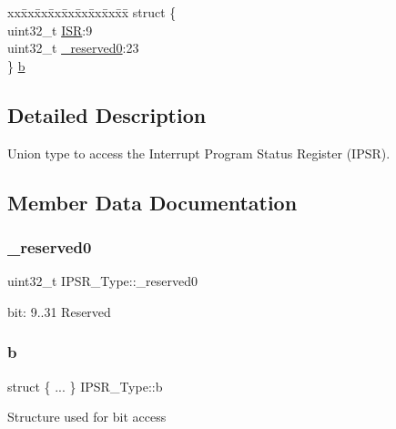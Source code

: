 \begin{DoxyCompactItemize}
\begin{tabbing}
\end{tabbing}\item 
\begin{tabbing}
xx\=xx\=xx\=xx\=xx\=xx\=xx\=xx\=xx\=\kill
struct \{\\
\>uint32\_t \mbox{\hyperlink{union_i_p_s_r___type_ab46e5f1b2f4d17cfb9aca4fffcbb2fa5}{ISR}}:9\\
\>uint32\_t \mbox{\hyperlink{union_i_p_s_r___type_ad2eb0a06de4f03f58874a727716aa9aa}{\_reserved0}}:23\\
\} \mbox{\hyperlink{union_i_p_s_r___type_a4f5b60c40c6b98068f74da39a8d501ca}{b}}\\

\end{tabbing}\end{DoxyCompactItemize}


\subsection{Detailed Description}
Union type to access the Interrupt Program Status Register (I\+P\+SR). 

\subsection{Member Data Documentation}
\mbox{\label{union_i_p_s_r___type_ad2eb0a06de4f03f58874a727716aa9aa}} 
\subsubsection{\texorpdfstring{\_reserved0}{\_reserved0}}
{\footnotesize\ttfamily uint32\+\_\+t I\+P\+S\+R\+\_\+\+Type\+::\+\_\+reserved0}

bit\+: 9..31 Reserved \mbox{\label{union_i_p_s_r___type_a2006d2ca6e88ca91ae1156fd750587de}} 
\subsubsection{\texorpdfstring{b}{b}\hspace{0.1cm}{\footnotesize\ttfamily [1/12]}}
{\footnotesize\ttfamily struct \{ ... \}   I\+P\+S\+R\+\_\+\+Type\+::b}

Structure used for bit access \mbox{\label{union_i_p_s_r___type_a53babc0905b7d49ccf703851e101b38a}} 
